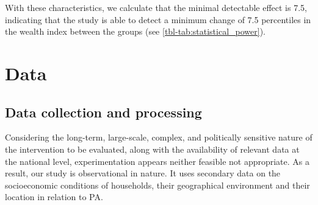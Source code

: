 \documentclass[
]{article}
\begin{document}
With these characteristics, we calculate that the minimal detectable
effect is 7.5, indicating that the study is able to detect a minimum
change of 7.5 percentiles in the wealth index between the groups (see
\autoref{tbl-tab:statistical_power}).


\begin{table}

\caption{\label{tbl-tab:statistical_power}Statistical power of the rural household percentile wealth index}


\end{table}%

\section{Data}\label{data}

\subsection{Data collection and
processing}\label{data-collection-and-processing}

Considering the long-term, large-scale, complex, and politically
sensitive nature of the intervention to be evaluated, along with the
availability of relevant data at the national level, experimentation
appears neither feasible not appropriate. As a result, our study is
observational in nature. It uses secondary data on the socioeconomic
conditions of households, their geographical environment and their
location in relation to PA.
\end{document}
